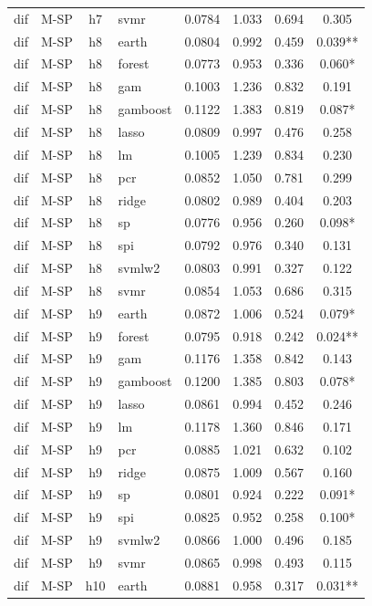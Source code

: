 \begin{ThreePartTable}
\begin{longtable}[t]{llclcccc}
dif & M-SP & h7 & svmr & 0.0784 & 1.033 & 0.694 & 0.305\\
\addlinespace
dif & M-SP & h8 & earth & 0.0804 & 0.992 & 0.459 & 0.039**\\
dif & M-SP & h8 & forest & 0.0773 & 0.953 & 0.336 & 0.060*\\
dif & M-SP & h8 & gam & 0.1003 & 1.236 & 0.832 & 0.191\\
dif & M-SP & h8 & gamboost & 0.1122 & 1.383 & 0.819 & 0.087*\\
dif & M-SP & h8 & lasso & 0.0809 & 0.997 & 0.476 & 0.258\\
dif & M-SP & h8 & lm & 0.1005 & 1.239 & 0.834 & 0.230\\
dif & M-SP & h8 & pcr & 0.0852 & 1.050 & 0.781 & 0.299\\
dif & M-SP & h8 & ridge & 0.0802 & 0.989 & 0.404 & 0.203\\
dif & M-SP & h8 & sp & 0.0776 & 0.956 & 0.260 & 0.098*\\
dif & M-SP & h8 & spi & 0.0792 & 0.976 & 0.340 & 0.131\\
dif & M-SP & h8 & svmlw2 & 0.0803 & 0.991 & 0.327 & 0.122\\
dif & M-SP & h8 & svmr & 0.0854 & 1.053 & 0.686 & 0.315\\
\addlinespace
dif & M-SP & h9 & earth & 0.0872 & 1.006 & 0.524 & 0.079*\\
dif & M-SP & h9 & forest & 0.0795 & 0.918 & 0.242 & 0.024**\\
dif & M-SP & h9 & gam & 0.1176 & 1.358 & 0.842 & 0.143\\
dif & M-SP & h9 & gamboost & 0.1200 & 1.385 & 0.803 & 0.078*\\
dif & M-SP & h9 & lasso & 0.0861 & 0.994 & 0.452 & 0.246\\
dif & M-SP & h9 & lm & 0.1178 & 1.360 & 0.846 & 0.171\\
dif & M-SP & h9 & pcr & 0.0885 & 1.021 & 0.632 & 0.102\\
dif & M-SP & h9 & ridge & 0.0875 & 1.009 & 0.567 & 0.160\\
dif & M-SP & h9 & sp & 0.0801 & 0.924 & 0.222 & 0.091*\\
dif & M-SP & h9 & spi & 0.0825 & 0.952 & 0.258 & 0.100*\\
dif & M-SP & h9 & svmlw2 & 0.0866 & 1.000 & 0.496 & 0.185\\
dif & M-SP & h9 & svmr & 0.0865 & 0.998 & 0.493 & 0.115\\
\addlinespace
dif & M-SP & h10 & earth & 0.0881 & 0.958 & 0.317 & 0.031**\\

\end{longtable}
\end{ThreePartTable}
